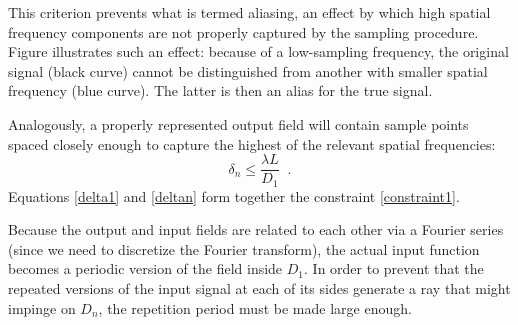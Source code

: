\documentclass[12pt]{article}
\begin{document}
This criterion prevents what is termed aliasing, an effect by which high spatial frequency components are not properly captured by the sampling procedure. Figure illustrates such an effect: because of a low-sampling frequency, the original signal (black curve) cannot be distinguished from another with smaller spatial frequency (blue curve). The latter is then an alias for the true signal.

Analogously, a properly represented output field will contain sample points spaced closely enough to capture the highest of the relevant spatial frequencies:
\begin{equation}
\delta_n \leq \frac{\lambda L}{D_1} \; \label{deltan} \; .
\end{equation}
Equations \eqref{delta1} and \eqref{deltan} form together the constraint \eqref{constraint1}.

Because the output and input fields are related to each other via a Fourier series (since we need to discretize the Fourier transform), the actual input function becomes a periodic version of the field inside $D_1$. In order to prevent that the repeated versions of the input signal at each of its sides generate a ray that might impinge on $D_n$, the repetition period must be made large enough. 
\end{document}
